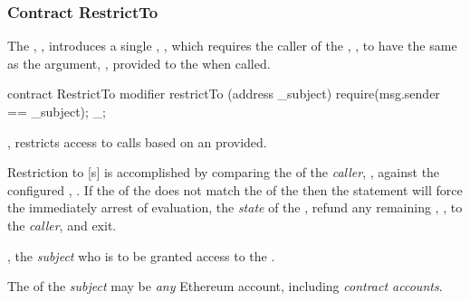 \subsubsection{Contract RestrictTo}

The , , introduces a single
, , which requires the caller of the
, , to have the same  as the
argument, , provided to the  when called.

\begin{solidity}
contract RestrictTo {
  modifier restrictTo (address _subject) {
    require(msg.sender == _subject);
    _;
  }
}
\end{solidity}

\begin{code}
  \begin{modifiers}
    \item {}, restricts access to
       calls based on an  provided.

      \begin{displayquote}
        Restriction to [s] is accomplished by comparing the
         of the  \emph{caller}, ,
        against the configured , . If the
         of the  does not match the
         of the  then the  statement
        will force the immediately arrest of  evaluation,
         the \emph{state} of the , refund any
        remaining , , to the \emph{caller}, and
        exit.\footnotemark{}

      \end{displayquote}


      \begin{parameters}
      \item {}, the \emph{subject} who is to be granted
        access to the .

        \begin{displayquote}
          The  of the \emph{subject} may be \emph{any} Ethereum
          account, including \emph{contract accounts}.
        \end{displayquote}
      \end{parameters}
  \end{modifiers}
\end{code}
